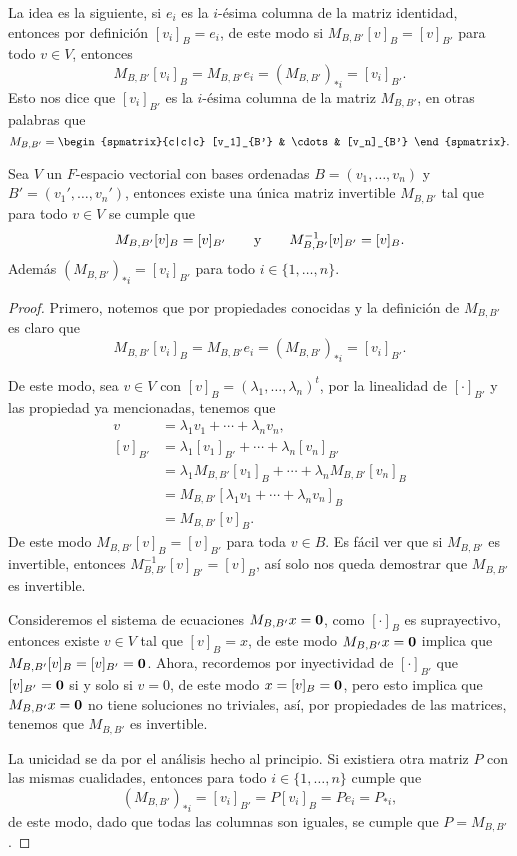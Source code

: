 La idea es la siguiente, si $e_i$ es la $i$-ésima columna de la matriz identidad, entonces por definición $[v_i]_B = e_i$, de este modo si $M_{B,B'} [v]_B = [v]_{B'}$ para todo $v \in V$, entonces
  \[ M_{B,B'} [v_i]_B = M_{B,B'} e_i = (M_{B,B'})_{*i} = [v_i]_{B'}. \]
Esto nos dice que $[v_i]_{B'}$ es la $i$-ésima columna de la matriz $M_{B,B'}$, en otras palabras que
  \[ M_{B,B'} = \begin{spmatrix}{c|c|c}  [v_1]_{B'} & \cdots & [v_n]_{B'}  \end{spmatrix}. \]

\begin{teor}
  Sea $V$ un $F$-espacio vectorial con bases ordenadas $B = (v_1,\ldots,v_n)$ y $B' = (v_1',\ldots,v_n')$, entonces existe una única matriz invertible $M_{B,B'}$ tal que para todo $v \in V$ se cumple que
    \[ M_{B,B'}[v]_B = [v]_{B'} \qquad\text{y}\qquad M_{B,B'}^{-1}[v]_{B'} = [v]_B. \]
  Además $(M_{B,B'})_{*i} = [v_i]_{B'}$ para todo $i \in \{1,\ldots,n\}$.
\end{teor}
\begin{proof}
  Primero, notemos que por propiedades conocidas y la definición de $M_{B,B'}$ es claro que 
    \[ M_{B,B'}[v_i]_B = M_{B,B'} e_i =  (M_{B,B'})_{*i} = [v_i]_{B'}. \]

  De este modo, sea $v \in V$ con $[v]_B = (\lambda_1,\ldots,\lambda_n)^t$, por la linealidad de $[\cdot]_{B'}$ y las propiedad ya mencionadas, tenemos que
    \begin{align*}
      v        &= \lambda_1 v_1 + \cdots + \lambda_n v_n, \\
      [v]_{B'} &= \lambda_1 [v_1]_{B'} + \cdots + \lambda_n [v_n]_{B'} \\
               &= \lambda_1 M_{B,B'}[v_1]_B + \cdots + \lambda_n M_{B,B'}[v_n]_B \\
               &= M_{B,B'} [\lambda_1 v_1 + \cdots + \lambda_n v_n ]_B \\
               &= M_{B,B'} [ v ]_B.
    \end{align*}
  De este modo $M_{B,B'}[v]_B = [v]_{B'}$ para toda $v \in B$. Es fácil ver que si $M_{B,B'}$ es invertible, entonces $M_{B,B'}^{-1}[v]_{B'} = [v]_B$, así solo nos queda demostrar que $M_{B,B'}$ es invertible.
  
  Consideremos el sistema de ecuaciones $M_{B,B'}x = \mathbf{0}$, como $[\cdot]_B$ es suprayectivo, entonces existe $v \in V$ tal que $[v]_B = x$, de este modo $M_{B,B'}x = \mathbf{0}$ implica que $M_{B,B'}[v]_B = [v]_{B'} = \mathbf{0}$. Ahora, recordemos por inyectividad de $[\cdot]_{B'}$ que $[v]_{B'} = \mathbf{0}$ si y solo si $v = 0$, de este modo $x = [v]_{B} = \mathbf{0}$, pero esto implica que $M_{B,B'}x = \mathbf{0}$ no tiene soluciones no triviales, así, por propiedades de las matrices, tenemos que $M_{B,B'}$ es invertible.

  La unicidad se da por el análisis hecho al principio. Si existiera otra matriz $P$ con las mismas cualidades, entonces para todo $i \in \{1,\ldots, n\}$ cumple que
  \[ (M_{B,B'})_{*i} = [v_i]_{B'} = P[v_i]_{B} = Pe_i = P_{*i},\]
  de este modo, dado que todas las columnas son iguales, se cumple que $P = M_{B,B'}$.
\end{proof}

